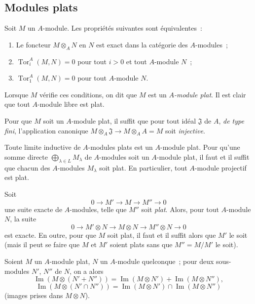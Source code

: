\subsection{Modules plats}
\label{subsection:0.6.1-fr}

\begin{env}[6.1.1]
\label{0.6.1.1-fr}
Soit $M$ un $A$-module. Les propriétés suivantes sont équivalentes~:
\begin{enumerate}
  \item[$a)$] Le foncteur $M\otimes_A N$ en $N$ est exact dans la catégorie
    des $A$-modules~;
  \item[$b)$] $\operatorname{Tor}_i^A(M,N)=0$ pour tout $i>0$ et tout
    $A$-module $N$~;
  \item[$c)$] $\operatorname{Tor}_1^A(M,N)=0$ pour tout $A$-module $N$.
\end{enumerate}

Lorsque $M$ vérifie ces conditions, on dit que $M$ est un
\emph{$A$-module plat}. Il est clair que tout $A$-module libre est plat.

Pour que $M$ soit un $A$-module plat, il suffit que pour tout idéal
$\mathfrak{J}$ de $A$, \emph{de type fini}, l'application canonique
$M\otimes_A\mathfrak{J}\to M\otimes_A A=M$ soit \emph{injective}.
\end{env}

\begin{env}[6.1.2]
\label{0.6.1.2-fr}
Toute limite inductive de $A$-modules plats est un $A$-module plat. Pour
qu'une somme directe $\bigoplus_{\lambda\in L}M_\lambda$ de $A$-modules soit
un $A$-module plat, il faut et il suffit que chacun des $A$-modules
$M_\lambda$ soit plat. En particulier, tout $A$-module projectif est plat.

Soit
\[
  0\longrightarrow M'\longrightarrow M\longrightarrow M''\longrightarrow 0
\]
une suite exacte de $A$-modules, telle que $M''$ soit \emph{plat}. Alors, pour
tout $A$-module $N$, la suite
\[
  0\longrightarrow M'\otimes N\longrightarrow M\otimes N
  \longrightarrow M''\otimes N\longrightarrow 0
\]
est exacte. En outre, pour que $M$ soit plat, il faut et il suffit alors que
$M'$ le soit (mais il peut se faire que $M$ et $M'$ soient plats sans que
$M''=M/M'$ le soit).
\end{env}

\begin{env}[6.1.3]
\label{0.6.1.3-fr}
Soient $M$ un $A$-module plat, $N$ un $A$-module quelconque~; pour deux
sous-modules $N'$, $N''$ de $N$, on a alors
\[
  \operatorname{Im}(M\otimes(N'+N''))
  =\operatorname{Im}(M\otimes N')+\operatorname{Im}(M\otimes N''),
\]
\[
  \operatorname{Im}(M\otimes(N'\cap N''))
  =\operatorname{Im}(M\otimes N')\cap\operatorname{Im}(M\otimes N'')
\]
(images prises dans $M\otimes N$).
\end{env}

